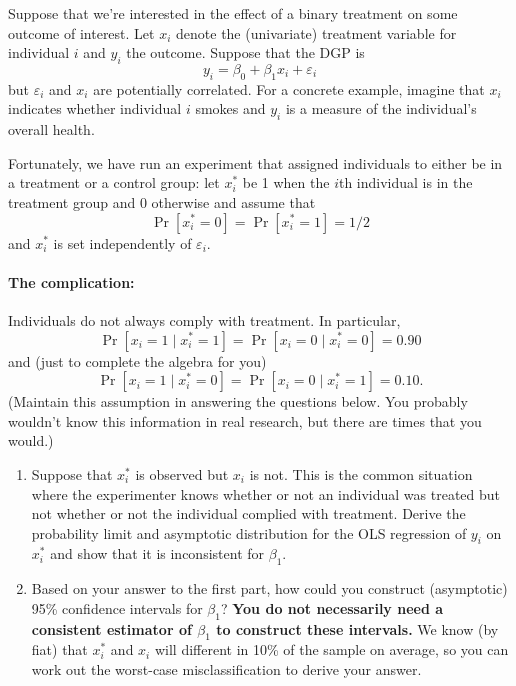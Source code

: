 \begin{hw}
  Suppose that we're interested in the effect of a binary treatment on
  some outcome of interest. Let $x_i$ denote the (univariate)
  treatment variable for individual $i$ and $y_i$ the outcome.
  Suppose that the DGP is
  \begin{equation}\label{eq:1}
    y_i = \beta_0 + \beta_1 x_i + \varepsilon_i
  \end{equation}
  but $\varepsilon_i$ and $x_i$ are potentially correlated.  For a
  concrete example, imagine that $x_i$ indicates whether individual
  $i$ smokes and $y_i$ is a measure of the individual's overall
  health.

  Fortunately, we have run an experiment that assigned individuals to
  either be in a treatment or a control group: let $x_i^*$ be 1 when
  the $i$th individual is in the treatment group and 0 otherwise and
  assume that
  \begin{equation}
    \Pr[x_i^* = 0] = \Pr[x_i^* = 1] = 1/2
  \end{equation}
  and $x_i^*$ is set independently of $\varepsilon_i$.

  \paragraph{The complication:} Individuals do not always comply with
  treatment. In particular,
  \begin{equation}
    \Pr[x_i = 1 \mid x_i^* = 1] = \Pr[x_i = 0 \mid x_i^* = 0] = 0.90
  \end{equation}
  and (just to complete the algebra for you)
  \begin{equation}
    \Pr[x_i = 1 \mid x_i^* = 0] = \Pr[x_i = 0 \mid x_i^* = 1] = 0.10.
  \end{equation}
  (Maintain this assumption in answering the questions below. You
  probably wouldn't know this information in real research, but there
  are times that you would.)

  \begin{enumerate}
  \item Suppose that $x_i^*$ is observed but $x_i$ is not.  This is
    the common situation where the experimenter knows whether or not
    an individual was treated but not whether or not the individual
    complied with treatment.  Derive the probability limit and
    asymptotic distribution for the OLS regression of $y_i$ on $x_i^*$
    and show that it is inconsistent for $\beta_1$.

  \item Based on your answer to the first part, how could you
    construct (asymptotic) 95\% confidence intervals for $\beta_1$?
    {\bfseries You do not necessarily need a consistent estimator of
      $\beta_1$ to construct these intervals.}  We know (by fiat) that
    $x_i^*$ and $x_i$ will different in 10\% of the sample on average,
    so you can work out the worst-case misclassification to derive
    your answer.


\end{enumerate}
\end{hw}
